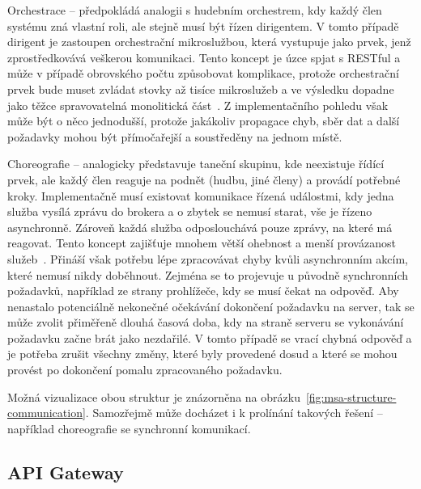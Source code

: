 \begin{dl}
   \item [Orchestrace] – předpokládá analogii s hudebním orchestrem, kdy každý člen systému zná vlastní roli, ale stejně musí být řízen dirigentem.
   V tomto případě dirigent je zastoupen orchestrační mikroslužbou, která vystupuje jako prvek, jenž zprostředkovává veškerou komunikaci.
   Tento koncept je úzce spjat s RESTful  a může v případě obrovského počtu  způsobovat komplikace, protože orchestrační prvek bude muset zvládat stovky až tisíce mikroslužeb a ve výsledku dopadne jako těžce spravovatelná monolitická část~\cite{choreovsorch}.
   Z implementačního pohledu však může být o něco jednodušší, protože jakákoliv propagace chyb, sběr dat a další požadavky mohou být přímočařejší a soustředěny na jednom místě.

   \item [Choreografie] – analogicky představuje taneční skupinu, kde neexistuje řídící prvek, ale každý člen reaguje na podnět (hudbu, jiné členy) a provádí potřebné kroky.
   Implementačně musí existovat komunikace řízená událostmi, kdy jedna služba vysílá zprávu do brokera a o zbytek se nemusí starat, vše je řízeno asynchronně.
   Zároveň každá služba odposlouchává pouze zprávy, na které má reagovat.
   Tento koncept zajišťuje mnohem větší ohebnost a menší provázanost služeb~\cite{choreovsorch}.
   Přináší však potřebu lépe zpracovávat chyby kvůli asynchronním akcím, které nemusí nikdy doběhnout.
   Zejména se to projevuje u původně synchronních požadavků, například ze strany prohlížeče, kdy se musí čekat na odpověď.
   Aby nenastalo potenciálně nekonečné očekávání dokončení požadavku na server, tak se může zvolit přiměřeně dlouhá časová doba, kdy na straně serveru se vykonávání požadavku začne brát jako nezdařilé.
   V tomto případě se vrací chybná odpověď a je potřeba zrušit všechny změny, které byly provedené dosud a které se mohou provést po dokončení pomalu zpracovaného požadavku.
\end{dl}

Možná vizualizace obou struktur je znázorněna na obrázku~\ref{fig:msa-structure-communication}.
Samozřejmě může docházet i k prolínání takových řešení – například choreografie se synchronní komunikací.



\subsection{API Gateway}\label{subsec:api-gateway}

